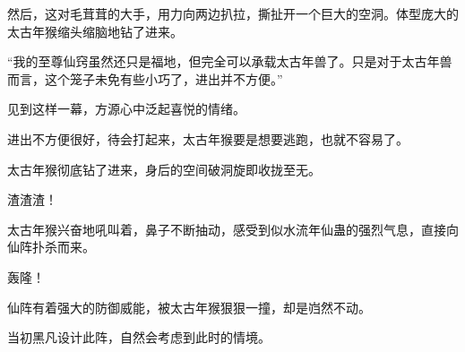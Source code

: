 \begin{this_body}
然后，这对毛茸茸的大手，用力向两边扒拉，撕扯开一个巨大的空洞。体型庞大的太古年猴缩头缩脑地钻了进来。

“我的至尊仙窍虽然还只是福地，但完全可以承载太古年兽了。只是对于太古年兽而言，这个笼子未免有些小巧了，进出并不方便。”

见到这样一幕，方源心中泛起喜悦的情绪。

进出不方便很好，待会打起来，太古年猴要是想要逃跑，也就不容易了。

太古年猴彻底钻了进来，身后的空间破洞旋即收拢至无。

渣渣渣！

太古年猴兴奋地吼叫着，鼻子不断抽动，感受到似水流年仙蛊的强烈气息，直接向仙阵扑杀而来。

轰隆！

仙阵有着强大的防御威能，被太古年猴狠狠一撞，却是岿然不动。

当初黑凡设计此阵，自然会考虑到此时的情境。

\end{this_body}

